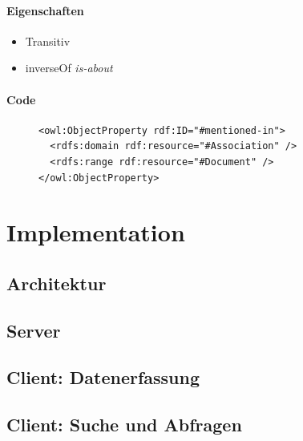 \documentclass[
    11pt,
    latin1,
    a4paper,
    oneside
]{scrreprt}
\begin{document}
\subsubsection{Eigenschaften} \label{sec:rel_mentionedin_settings}

\begin{itemize}
  \item Transitiv
  \item inverseOf \emph{is-about}
\end{itemize}

\subsubsection{Code} \label{sec:rel_mentionedin_code}

\begin{figure}[H]
 \lstset{language=XML}
 \begin{lstlisting}[label=owl:mentionedin,caption={Die Relation \emph{mentioned-in} gibt alle \emph{Document} an, in welcher eine \emph{Association} erw\"ahnt wird}]
<owl:ObjectProperty rdf:ID="#mentioned-in">
  <rdfs:domain rdf:resource="#Association" />
  <rdfs:range rdf:resource="#Document" />
</owl:ObjectProperty>
 \end{lstlisting}
\end{figure}



\chapter{Implementation} \label{sec:implementation}

\section{Architektur} \label{sec:design}


\section{Server} \label{sec:impl_server}


\section{Client: Datenerfassung} \label{sec:impl_client}


\section{Client: Suche und Abfragen} \label{sec:impl_search}
\end{document}
